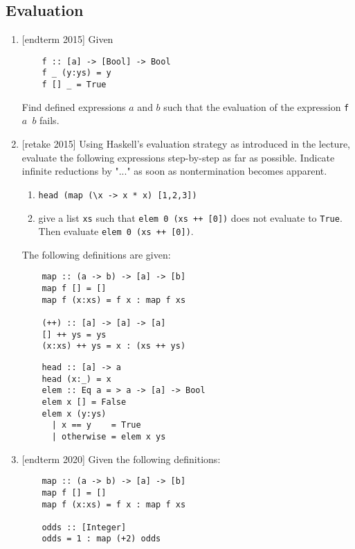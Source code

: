 \documentclass{article}
\def\code#1{\texttt{#1}}
\begin{document}
\subsection{Evaluation}
\begin{enumerate}
    \item {[endterm 2015]} Given
        \begin{verbatim}
    f :: [a] -> [Bool] -> Bool
    f _ (y:ys) = y
    f [] _ = True
        \end{verbatim}
        Find defined expressions $a$ and $b$ such that the evaluation of the expression \code{f $a$ $b$} fails.

    \item {[retake 2015]} Using Haskell's evaluation strategy as introduced in the lecture, evaluate the following expressions step-by-step as far as possible. Indicate infinite reductions by "..." as soon as nontermination becomes apparent.
        \begin{enumerate}
            \item \code{head (map (\textbackslash x -> x * x) [1,2,3])}
            \item give a list \code{xs} such that \code{elem 0 (xs ++ [0])} does not evaluate to \code{True}. Then evaluate \code{elem 0 (xs ++ [0])}.
        \end{enumerate}
        The following definitions are given:
        \begin{multicols}{2}
        \begin{verbatim}
    map :: (a -> b) -> [a] -> [b]
    map f [] = []
    map f (x:xs) = f x : map f xs

    (++) :: [a] -> [a] -> [a]
    [] ++ ys = ys
    (x:xs) ++ ys = x : (xs ++ ys)
        \end{verbatim}
        \begin{verbatim}
    head :: [a] -> a
    head (x:_) = x
    elem :: Eq a = > a -> [a] -> Bool
    elem x [] = False
    elem x (y:ys)
      | x == y    = True
      | otherwise = elem x ys
        \end{verbatim}
        \end{multicols}

    \item {[endterm 2020]} Given the following definitions:
        \begin{multicols}{2}
        \begin{verbatim}
    map :: (a -> b) -> [a] -> [b]
    map f [] = []
    map f (x:xs) = f x : map f xs

    odds :: [Integer]
    odds = 1 : map (+2) odds


\end{verbatim}
\end{multicols}
\end{enumerate}
\end{document}
